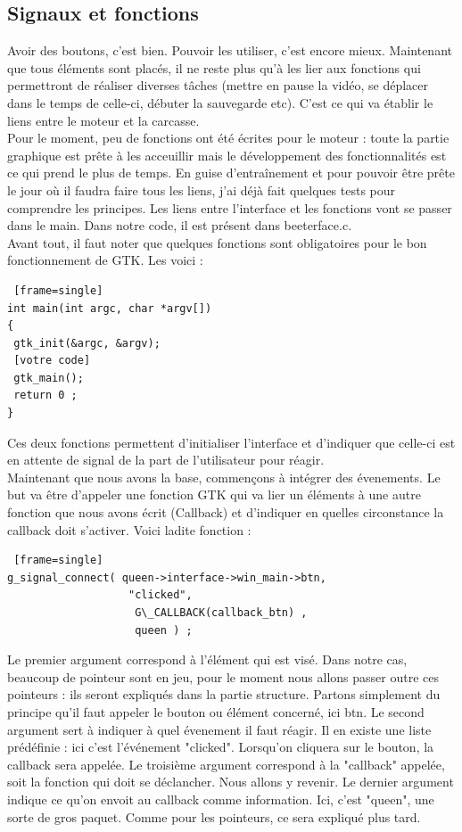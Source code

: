 \documentclass[11pt,french,a4paper]{report}
\begin{document}
        \subsection{Signaux et fonctions} 
Avoir des boutons, c'est bien. Pouvoir les utiliser, c'est encore mieux. Maintenant que tous éléments sont placés, 
il ne reste plus qu'à les lier aux fonctions qui permettront de réaliser diverses tâches (mettre en pause la vidéo,
se déplacer dans le temps de celle-ci, débuter la sauvegarde etc).    
C'est ce qui va établir le liens entre le moteur et la carcasse. \\
Pour le moment, peu de fonctions ont été écrites pour le moteur : toute la partie graphique est prête à les acceuillir 
mais le développement des fonctionnalités est ce qui prend le plus de temps. En guise d'entraînement et pour 
pouvoir être prête le jour où il faudra faire tous les liens, j'ai déjà fait quelques tests pour comprendre les principes.
Les liens entre l'interface et les fonctions vont se passer dans le main. Dans notre code, il est présent dans beeterface.c.\\
Avant tout, il faut noter que quelques fonctions sont obligatoires pour le bon fonctionnement de GTK. Les voici : \\
\begin{lstlisting} [frame=single]
int main(int argc, char *argv[])     
{ 
 gtk_init(&argc, &argv); 
 [votre code] 
 gtk_main();
 return 0 ;
} 
\end{lstlisting}
Ces deux fonctions permettent d'initialiser l'interface et d'indiquer que celle-ci est en attente de signal
de la part de l'utilisateur pour réagir. \\
Maintenant que nous avons la base, commençons à intégrer des évenements.
Le but va être d'appeler une fonction GTK qui va lier un éléments à une autre fonction que nous avons écrit  (Callback) 
et d'indiquer en quelles circonstance la callback doit s'activer. Voici ladite fonction : 
\begin{lstlisting} [frame=single]
g_signal_connect( queen->interface->win_main->btn,
                   "clicked", 
                    G\_CALLBACK(callback_btn) ,
                    queen ) ; 
\end{lstlisting}
Le premier argument correspond à l'élément qui est visé. Dans notre cas, beaucoup de pointeur sont en jeu,
pour le moment nous allons passer outre ces pointeurs : ils seront expliqués dans la partie structure. 
Partons simplement du principe qu'il faut appeler le bouton ou élément concerné, ici btn.  
Le second argument sert à indiquer à quel évenement il faut réagir. Il en existe une liste prédéfinie : ici
c'est l'événement "clicked". Lorsqu'on cliquera sur le bouton, la callback sera appelée. 
Le troisième argument correspond à la "callback" appelée, soit la fonction qui doit se déclancher. Nous allons 
y revenir.
Le dernier argument indique ce qu'on envoit au callback comme information. Ici, c'est "queen", une sorte de 
gros paquet. Comme pour les pointeurs, ce sera expliqué plus tard. \\
\end{document}
